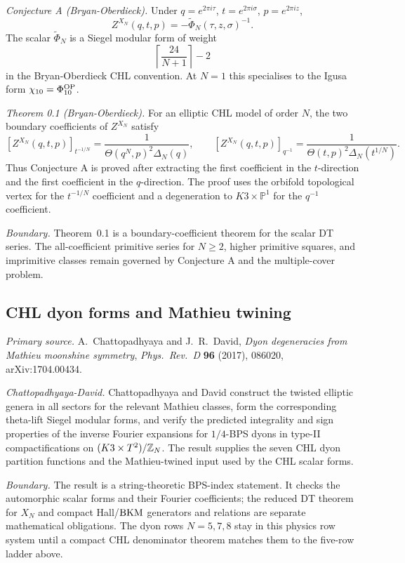 \emph{Conjecture A (Bryan-Oberdieck).}
Under \(q=e^{2\pi i\tau}\),
\(t=e^{2\pi i\sigma}\), \(p=e^{2\pi iz}\),
\[
  Z^{X_N}(q,t,p)
  =
  -\widetilde\Phi_N(\tau,z,\sigma)^{-1}.
\]
The scalar \(\widetilde\Phi_N\) is a Siegel modular form of weight
\[
  \left\lceil \frac{24}{N+1}\right\rceil -2
\]
in the Bryan-Oberdieck CHL convention. At \(N=1\) this specialises to
the Igusa form \(\chi_{10}=\Phi_{10}^{\mathrm{OP}}\).

\emph{Theorem 0.1 (Bryan-Oberdieck).}
For an elliptic CHL model of order \(N\), the two
boundary coefficients of \(Z^{X_N}\) satisfy
\[
  [Z^{X_N}(q,t,p)]_{t^{-1/N}}
  =
  \frac{1}{\Theta(q^N,p)^2\Delta_N(q)},
  \qquad
  [Z^{X_N}(q,t,p)]_{q^{-1}}
  =
  \frac{1}{\Theta(t,p)^2\Delta_N(t^{1/N})}.
\]
Thus Conjecture A is proved after extracting the first coefficient in
the \(t\)-direction and the first coefficient in the \(q\)-direction.
The proof uses the orbifold topological vertex for the \(t^{-1/N}\)
coefficient and a degeneration to \(K3\times\mathbb P^1\) for the
\(q^{-1}\) coefficient.

\emph{Boundary.} Theorem~0.1 is a boundary-coefficient theorem for the
scalar DT series. The all-coefficient primitive series for \(N\ge2\), higher
primitive squares, and imprimitive classes remain governed by
Conjecture A and the multiple-cover problem.

\subsection*{CHL dyon forms and Mathieu twining}

\emph{Primary source.} A.~Chattopadhyaya and J.~R.~David,
\emph{Dyon degeneracies from Mathieu moonshine symmetry},
\emph{Phys.\ Rev.\ D} \textbf{96} (2017), 086020, arXiv:1704.00434.

\emph{Chattopadhyaya-David.}
Chattopadhyaya and David construct the twisted elliptic genera in all
sectors for the relevant
Mathieu classes, form the corresponding theta-lift Siegel modular
forms, and verify the predicted integrality and sign properties of the
inverse Fourier expansions for \(1/4\)-BPS dyons in type-II
compactifications on \((K3\times T^2)/\mathbb{Z}_N\). The result supplies the
seven CHL dyon partition functions and the Mathieu-twined input used by
the CHL scalar forms.

\emph{Boundary.} The result is a string-theoretic BPS-index statement.
It checks the automorphic scalar forms and their Fourier coefficients;
the reduced DT theorem for \(X_N\) and compact Hall/\(\mathrm{BKM}\) generators
and relations are separate mathematical obligations. The dyon rows
\(N=5,7,8\) stay in this physics row system until a compact CHL
denominator theorem matches them to the five-row ladder above.

